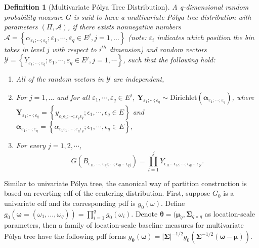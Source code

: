 \documentclass{article}
\newtheorem{deff}[thm]{Definition}
\newcommand{\polya}{P\'{o}lya}
\begin{document}
\begin{deff}[Multivariate \polya{} Tree Distribution]
A q-dimensional random probability measure $G$ is said to have a
multivariate \polya{} tree distribution with parameters $(\Pi,
\mathcal{A})$, if there exists nonnegative numbers
$\mathcal{A}=\left\{ \alpha_{\varepsilon_1;\cdots;\varepsilon_q} ;
  \varepsilon_1, \cdots, \varepsilon_q \in E^j, j=1, \ldots \right\}$
(note: $\varepsilon_i$ indicates which position the bin takes in level
$j$ with respect to $i^{th}$ dimension) and random vectors
$\mathcal{Y} = \left\{ Y_{\varepsilon_1;\cdots;\varepsilon_q} ;
 \varepsilon_1, \cdots, \varepsilon_q \in E^j, j=1, \cdots \right\}$,
such that the following hold: 
\begin{enumerate}
\item All of the random vectors in $\mathcal{Y}$ are independent,
\item For $j=1, \ldots$ and for all $\varepsilon_1, \cdots,
  \varepsilon_q \in E^j$, $\bm{Y}_{\varepsilon_1;\cdots;\varepsilon_q}
  \sim \mathrm{Dirichlet}\left( \bm{\alpha}_{\varepsilon_1; \cdots;
      \varepsilon_q} \right)$, where
  $\bm{Y}_{\varepsilon_1;\cdots;\varepsilon_q} = \left\{
    y_{\varepsilon_1\epsilon_1; \cdots; \varepsilon_q\epsilon_q};
    \epsilon_1, \cdots, \epsilon_q \in E \right\}$ and
  $\bm{\alpha}_{\varepsilon_1; \cdots; 
      \varepsilon_q} = \left\{ \alpha_{\varepsilon_1\epsilon_1;
        \cdots; \varepsilon_q\epsilon_q}; \epsilon_1, \cdots,
      \epsilon_q \in E \right\}$,
\item For every $j=1,2, \cdots$, 
\begin{displaymath}
G(B_{\epsilon_{11},\cdots,
  \epsilon_{1j};\cdots;\epsilon_{q1}\cdots\epsilon_{qj}}) =
\prod_{l=1}^j Y_{\epsilon_{11}\cdots \epsilon_{1l}; \cdots ;
  \epsilon_{q1}\cdots\epsilon_{ql}}. 
\end{displaymath}
\end{enumerate}
\end{deff}

Similar to univariate \polya{} tree, the canonical way of partition
construction is based on reverting cdf of the centering
distribution. First, suppose $G_0$ is a univariate cdf and its
corresponding pdf is $g_0(\omega)$. Define $g_0(\bm{\omega}=(\omega_1,
\ldots, \omega_q)) = \prod_{i=1}^q g_0(\omega_i)$. Denote
$\bm{\theta}= (\bm{\mu}_q, \bm{\Sigma}_{q\times q}$ as location-scale
parameters, then a family of location-scale baseline measures for
multivariate \polya{} tree have the following pdf forms
$g_{\bm{\theta}} ( \bm{\omega}) = |\bm{\Sigma}|^{-1/2} g_0 (
\bm{\Sigma}^{-1/2} (\bm{\omega} - \bm{\mu}) ) $. 
\end{document}
